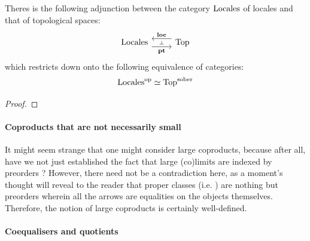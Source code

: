                     \begin{definition}
                        
                    \end{definition}
                    
                    \begin{theorem} \label{theorem: sobreity_and_spatiality}
                        Theres is the following adjunction between the category $\mathrm{Locales}$ of locales and that of topological spaces:
                            $$
                                \begin{tikzcd}
                                	\Locales & \Top
                                	\arrow[""{name=0, anchor=center, inner sep=0}, "\bfloc"', shift right=2, from=1-2, to=1-1]
                                	\arrow[""{name=1, anchor=center, inner sep=0}, "\bfpt"', shift right=2, from=1-1, to=1-2]
                                	\arrow["\dashv"{anchor=center, rotate=-90}, draw=none, from=0, to=1]
                                \end{tikzcd}
                            $$
                        which restricts down onto the following equivalence of categories:
                            $$\mathrm{Locales}^{\mathrm{op}} \simeq \mathrm{Top}^{\mathrm{sober}}$$
                    \end{theorem}
                        \begin{proof}
                            
                        \end{proof}
                    
                \paragraph{Coproducts that are not necessarily small}
                    It might seem strange that one might consider large coproducts, because after all, have we not just established the fact that large (co)limits are indexed by preorders ? However, there need not be a contradiction here, as a moment's thought will reveal to the reader that proper classes (i.e. ) are nothing but preorders wherein all the arrows are equalities on the objects themselves. Therefore, the notion of large coproducts is certainly well-defined. 
                    
                \paragraph{Coequalisers and quotients}    
                
